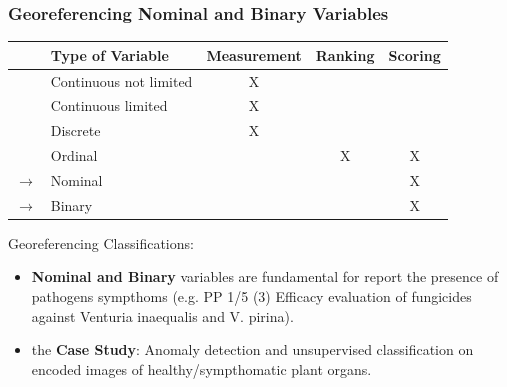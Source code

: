\documentclass[aspectratio=43]{beamer}
\begin{document}
\begin{frame}
    \frametitle{Georeferencing Nominal and Binary Variables}
    \begin{table}[ht]
        \centering
        \begin{tabular}{|c|l|c|c|c|}
        \hline
        & \textbf{Type of Variable} & \textbf{Measurement} & \textbf{Ranking} & \textbf{Scoring} \\
        \hline
        \rowcolor{green!20} & Continuous not limited & X & & \\
        \hline
        \rowcolor{green!20} & Continuous limited & X & & \\
        \hline
        \rowcolor{yellow!20} & Discrete & X & & \\
        \hline
        \rowcolor{red!20} & Ordinal & & X & X \\
        \hline
        \rowcolor{red!20} $\rightarrow$ & Nominal & & & X \\
        \hline
        \rowcolor{red!20} $\rightarrow$ & Binary & & & X \\
        \hline
        \end{tabular}
    \end{table}
    \begin{block}{Georeferencing Classifications:}
        \small
        \begin{itemize}
            \item \textbf{Nominal and Binary} variables are fundamental for report the presence of pathogens sympthoms (e.g. PP 1/5 (3) Efficacy evaluation of fungicides against Venturia inaequalis and V. pirina).
            \item the \textbf{Case Study}: Anomaly detection and unsupervised classification on encoded images of healthy/sympthomatic plant organs. 
            \end{itemize}
    \end{block}
\end{frame}


\end{document}
